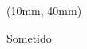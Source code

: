 \begin{textblock*}{100mm}(10mm, 40mm)
    \begin{block}{Sometido}    
        \begin{bibunit}[alpha]
	       \nocite{Jerez2017}
		  \putbib
	   \end{bibunit}
    \end{block}    
\end{textblock*} 